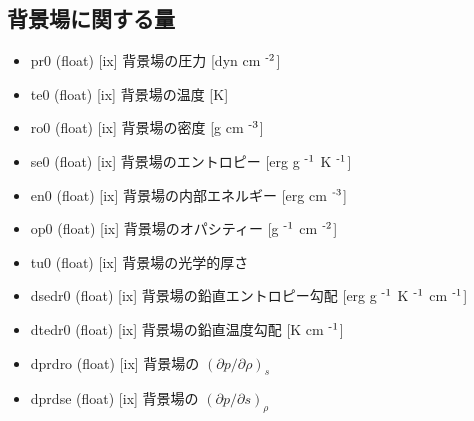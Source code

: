 \documentclass[letterpaper,10pt,dvipdfmx,report]{sphinxmanual}
\begin{document}
\subsection{背景場に関する量}
\label{\detokenize{notation:id3}}\begin{itemize}
\item {} 
\sphinxAtStartPar
pr0 (float) {[}ix{]} \sphinxhyphen{}\sphinxhyphen{} 背景場の圧力 {[}dyn cm $^{\text{\mbox{-}2}}${]}

\item {} 
\sphinxAtStartPar
te0 (float) {[}ix{]} \sphinxhyphen{}\sphinxhyphen{} 背景場の温度 {[}K{]}

\item {} 
\sphinxAtStartPar
ro0 (float) {[}ix{]} \sphinxhyphen{}\sphinxhyphen{} 背景場の密度 {[}g cm $^{\text{\mbox{-}3}}${]}

\item {} 
\sphinxAtStartPar
se0 (float) {[}ix{]} \sphinxhyphen{}\sphinxhyphen{} 背景場のエントロピー {[}erg g $^{\text{\mbox{-}1}}$ K $^{\text{\mbox{-}1}}${]}

\item {} 
\sphinxAtStartPar
en0 (float) {[}ix{]} \sphinxhyphen{}\sphinxhyphen{} 背景場の内部エネルギー {[}erg cm $^{\text{\mbox{-}3}}${]}

\item {} 
\sphinxAtStartPar
op0 (float) {[}ix{]} \sphinxhyphen{}\sphinxhyphen{} 背景場のオパシティー {[}g $^{\text{\mbox{-}1}}$ cm $^{\text{\mbox{-}2}}${]}

\item {} 
\sphinxAtStartPar
tu0 (float) {[}ix{]} \sphinxhyphen{}\sphinxhyphen{} 背景場の光学的厚さ

\item {} 
\sphinxAtStartPar
dsedr0 (float) {[}ix{]} \sphinxhyphen{}\sphinxhyphen{} 背景場の鉛直エントロピー勾配 {[}erg g $^{\text{\mbox{-}1}}$ K $^{\text{\mbox{-}1}}$ cm $^{\text{\mbox{-}1}}${]}

\item {} 
\sphinxAtStartPar
dtedr0 (float) {[}ix{]} \sphinxhyphen{}\sphinxhyphen{} 背景場の鉛直温度勾配 {[}K cm $^{\text{\mbox{-}1}}${]}

\item {} 
\sphinxAtStartPar
dprdro (float) {[}ix{]} \sphinxhyphen{}\sphinxhyphen{} 背景場の \((\partial p/\partial \rho)_s\)

\item {} 
\sphinxAtStartPar
dprdse (float) {[}ix{]} \sphinxhyphen{}\sphinxhyphen{} 背景場の \((\partial p/\partial s)_\rho\)


\end{itemize}
\end{document}
